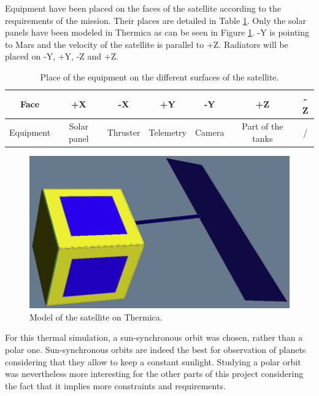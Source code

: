 \documentclass[a4paper, oneside, 11pt]{article}
\begin{document}
\medskip

Equipment have been placed on the faces of the satellite according to the requirements of the mission. Their places are detailed in Table \ref{places}. Only the solar panels have been modeled in Thermica as can be seen in Figure \ref{model}. -Y is pointing to Mars and the velocity of the satellite is parallel to +Z. Radiators will be placed on -Y, +Y, -Z and +Z.

\begin{table}[H]
 \caption{Place of the equipment on the different surfaces of the satellite.}
 \label{places}
\centering \begin{tabular}{| c | c |c |c |c |c |c |}
  \hline
Face & +X & -X & +Y & -Y & +Z & -Z\\
   \hline
 Equipment & Solar panel & Thruster  & Telemetry & Camera & Part of the tanks & / \\
     \hline
\end{tabular}
\end{table}

\begin{figure}[H] 
\centering
\includegraphics[scale=0.38]{model.png}
\caption{Model of the satellite on Thermica.}
\label{model}
\end{figure}


For this thermal simulation, a sun-synchronous orbit was chosen, rather than a polar one. Sun-synchronous orbits are indeed the best for observation of planets considering that they allow to keep a constant sunlight. Studying a polar orbit was nevertheless more interesting for the other parts of this project considering the fact that it implies more constraints and requirements.

\medskip
\end{document}
